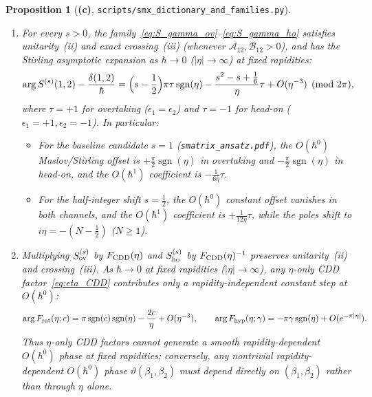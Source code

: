\documentclass[11pt,a4paper]{article}
\newcommand{\Lc}{\textsf{\textbf{(c)}}}
\newcommand{\script}[1]{\texttt{scripts/\allowbreak #1}}
\newcommand{\cA}{\mathcal{A}}
\newcommand{\cB}{\mathcal{B}}
\DeclareMathOperator{\sgn}{sgn}
\newtheorem{proposition}{Proposition}[section]
\theoremstyle{remark}
\begin{document}
\begin{proposition}[\Lc, \script{smx\_dictionary\_and\_families.py}]\label{prop:fam1}
\begin{enumerate}
\item For every $s>0$, the family~\eqref{eq:S_gamma_ov}--\eqref{eq:S_gamma_ho} satisfies unitarity~(ii) and exact crossing~(iii) (whenever $\cA_{12},\cB_{12}>0$), and has the Stirling asymptotic expansion as $\hbar\to 0$ ($|\eta|\to\infty$) at fixed rapidities:
\begin{equation}\label{eq:stirling_s}
\arg S^{(s)}(1,2)-\frac{\delta(1,2)}{\hbar}
=\Bigl(s-\frac12\Bigr)\pi\tau\sgn(\eta)-\frac{s^2-s+\frac16}{\eta}\tau+O(\eta^{-3})\pmod{2\pi},
\end{equation}
where $\tau=+1$ for overtaking ($\epsilon_1=\epsilon_2$) and $\tau=-1$ for head-on ($\epsilon_1=+1,\epsilon_2=-1$). In particular:
\begin{itemize}
\item For the baseline candidate $s=1$ (\texttt{smatrix\_ansatz.pdf}), the $O(\hbar^0)$ Maslov/Stirling offset is $+\frac\pi2\sgn(\eta)$ in overtaking and $-\frac\pi2\sgn(\eta)$ in head-on, and the $O(\hbar^1)$ coefficient is $-\frac1{6\eta}\tau$.
\item For the half-integer shift $s=\frac12$, the $O(\hbar^0)$ constant offset \emph{vanishes} in both channels, and the $O(\hbar^1)$ coefficient is $+\frac1{12\eta}\tau$, while the poles shift to $i\eta=-(N-\frac12)$ ($N\ge 1$).
\end{itemize}
\item Multiplying $S_{\rm ov}^{(s)}$ by $F_{\rm CDD}(\eta)$ and $S_{\rm ho}^{(s)}$ by $F_{\rm CDD}(\eta)^{-1}$ preserves unitarity~(ii) and crossing~(iii). As $\hbar\to 0$ at fixed rapidities ($|\eta|\to\infty$), any $\eta$-only CDD factor~\eqref{eq:eta_CDD} contributes \emph{only a rapidity-independent constant step} at $O(\hbar^0)$:
\begin{equation}\label{eq:eta_cdd_asymp}
\arg F_{\rm rat}(\eta;c)=\pi\sgn(c)\sgn(\eta)-\frac{2c}{\eta}+O(\eta^{-3}),\qquad
\arg F_{\rm hyp}(\eta;\gamma)=-\pi\gamma\sgn(\eta)+O(e^{-\pi|\eta|}).
\end{equation}
Thus $\eta$-only CDD factors cannot generate a smooth rapidity-dependent $O(\hbar^0)$ phase at fixed rapidities; conversely, any nontrivial rapidity-dependent $O(\hbar^0)$ phase $\vartheta(\beta_1,\beta_2)$ must depend directly on $(\beta_1,\beta_2)$ rather than through $\eta$ alone.
\end{enumerate}
\end{proposition}
\end{document}
